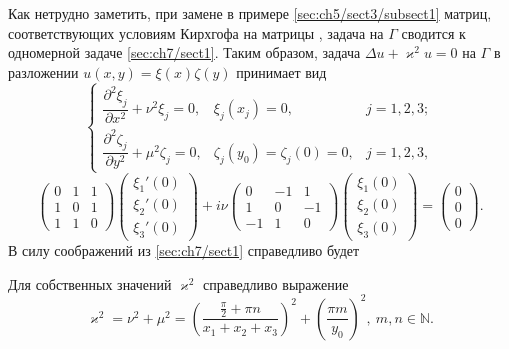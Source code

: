 Как нетрудно заметить, при замене в примере \ref{sec:ch5/sect3/subsect1} матриц, соответствующих условиям Кирхгофа на матрицы \label{eq:quantumBookCondition1D}, задача на $\Gamma$ сводится к одномерной задаче \ref{sec:ch7/sect1}.
Таким образом, задача $\Delta u + \varkappa^2 u = 0$ на $\Gamma$ в разложении $u(x,y) = \xi(x) \zeta(y)$ принимает вид
\begin{equation}
\left\{
\begin{array}{lll}
\dfrac{\partial^2 \xi_j}{\partial x^2}  + \nu^2 \xi_j = 0 , & \xi_j(x_j) = 0, & j=1,2,3; 	\\
\dfrac{\partial^2 \zeta_j}{\partial y^2}  + \mu^2 \zeta_j = 0 , & \zeta_j(y_0) = \zeta_j(0) = 0, & j=1,2,3,
\end{array}
\right.
\end{equation}
\begin{equation}
\begin{pmatrix}
0	&	1	&	1	\\
1	&	0	&	1	\\
1	&	1	&	0	
\end{pmatrix}
\begin{pmatrix}
\xi_1' (0) \\
\xi_2' (0) \\
\xi_3' (0)
\end{pmatrix} 
+ i \nu
\begin{pmatrix}
0	&	-1	&	1	\\
1	&	0	&	-1	\\
-1	&	1	&	0	
\end{pmatrix} 
\begin{pmatrix}
\xi_1(0) \\
\xi_2(0) \\
\xi_3(0) 
\end{pmatrix} = 
\begin{pmatrix}
0	\\	0	\\	0
\end{pmatrix}.
\label{eq:rectanglesBookCondition2D}
\end{equation}
В силу соображений из \ref{sec:ch7/sect1} справедливо будет
\begin{statement}
Для собственных значений $\varkappa^2$ справедливо выражение
$$\varkappa^2 = \nu^2+\mu^2 = \left( \frac{\frac{\pi}{2} + \pi n}{x_1+x_2+x_3} \right)^2 + \left( \frac{\pi m}{y_0} \right)^2, \ m,n \in \mathbb{N}.$$
\end{statement}

\clearpage
